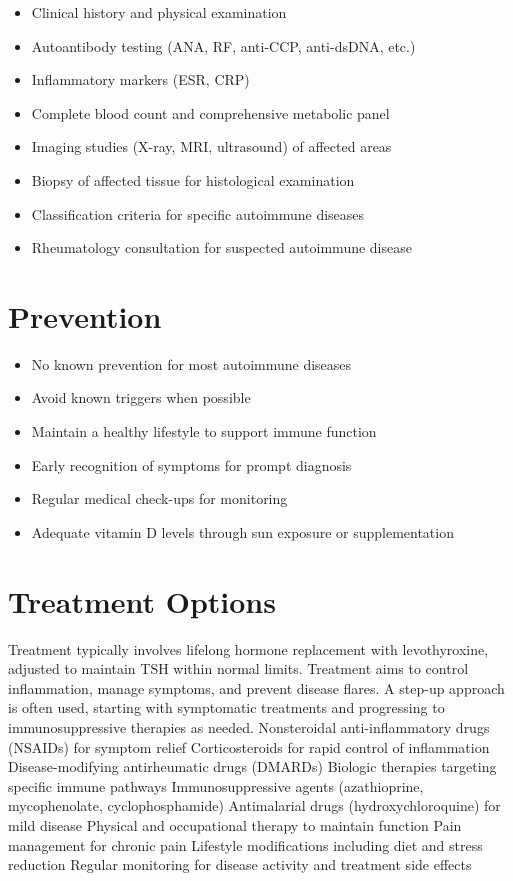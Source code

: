\begin{itemize}[noitemsep]
  \item Clinical history and physical examination
  \item Autoantibody testing (ANA, RF, anti-CCP, anti-dsDNA, etc.)
  \item Inflammatory markers (ESR, CRP)
  \item Complete blood count and comprehensive metabolic panel
  \item Imaging studies (X-ray, MRI, ultrasound) of affected areas
  \item Biopsy of affected tissue for histological examination
  \item Classification criteria for specific autoimmune diseases
  \item Rheumatology consultation for suspected autoimmune disease
\end{itemize}
\section{Prevention}
\begin{itemize}[noitemsep]
  \item No known prevention for most autoimmune diseases
  \item Avoid known triggers when possible
  \item Maintain a healthy lifestyle to support immune function
  \item Early recognition of symptoms for prompt diagnosis
  \item Regular medical check-ups for monitoring
  \item Adequate vitamin D levels through sun exposure or supplementation
\end{itemize}
\section{Treatment Options}
Treatment typically involves lifelong hormone replacement with levothyroxine, adjusted to maintain TSH within normal limits. Treatment aims to control inflammation, manage symptoms, and prevent disease flares. A step-up approach is often used, starting with symptomatic treatments and progressing to immunosuppressive therapies as needed. Nonsteroidal anti-inflammatory drugs (NSAIDs) for symptom relief Corticosteroids for rapid control of inflammation Disease-modifying antirheumatic drugs (DMARDs) Biologic therapies targeting specific immune pathways Immunosuppressive agents (azathioprine, mycophenolate, cyclophosphamide) Antimalarial drugs (hydroxychloroquine) for mild disease Physical and occupational therapy to maintain function Pain management for chronic pain Lifestyle modifications including diet and stress reduction Regular monitoring for disease activity and treatment side effects

